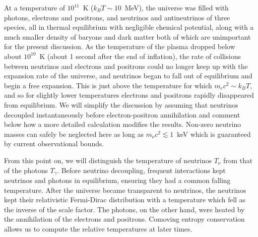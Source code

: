 At a temperature of $10^{11}$~K ($k_BT\sim10$~MeV), the universe was filled with photons, electrons and positrons, and neutrinos and antineutrinos of three species, all in thermal equilibrium with negligible chemical potential, along with a much smaller density of baryons and dark matter both of which are unimportant for the present discussion.  As the temperature of the plasma dropped below about $10^{10}$~K (about 1 second after the end of inflation), the rate of collisions between neutrinos and electrons and positrons could no longer keep up with the expansion rate of the universe, and neutrinos began to fall out of equilibrium and begin a free expansion.  This is just above the temperature for which $m_e c^2 \sim k_B T$, and so for slightly lower temperatures electrons and positrons rapidly disappeared from equilibrium.  We will simplify the discussion by assuming that neutrinos decoupled instantaneously before electron-positron annihilation and comment below how a more detailed calculation modifies the results.  Non-zero neutrino masses can safely be neglected here as long as $m_\nu c^2\lesssim1$~keV which is guaranteed by current observational bounds.

From this point on, we will distinguish the temperature of neutrinos $T_\nu$ from that of the photons $T_\gamma$.  Before neutrino decoupling, frequent interactions kept neutrinos and photons in equilibrium, ensuring they had a common falling temperature.  After the universe became transparent to neutrinos, the neutrinos kept their relativistic Fermi-Dirac distribution with a temperature which fell as the inverse of the scale factor.  The photons, on the other hand, were heated by the annihilation of the electrons and positrons.  Comoving entropy conservation allows us to compute the relative temperatures at later times.

